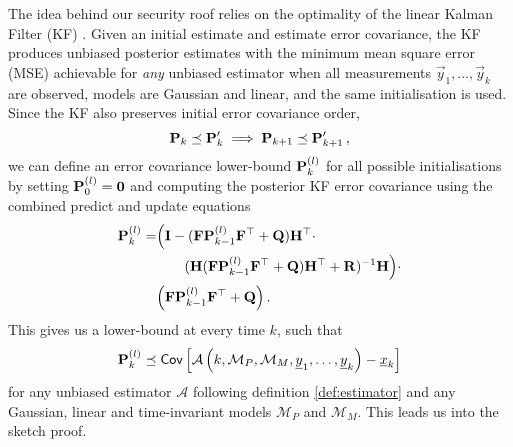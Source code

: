 \documentclass[letterpaper, 10 pt, conference]{IEEEtran}
\theoremstyle{definition}
\begin{document}
The idea behind our security roof relies on the optimality of the linear Kalman Filter (KF) \cite{haugBayesianEstimationTracking}. Given an initial estimate and estimate error covariance, the KF produces unbiased posterior estimates with the minimum mean square error (MSE) achievable for \textit{any} unbiased estimator when all measurements $\vec{y}_1,\dots,\vec{y}_k$ are observed, models are Gaussian and linear, and the same initialisation is used. Since the KF also preserves initial error covariance order,
\begin{equation}
   {\ensuremath{{\mathbf{P}}}}_k \preceq {\ensuremath{{\mathbf{P}}}}_k^\prime \implies {\ensuremath{{\mathbf{P}}}}_{k+1} \preceq {\ensuremath{{\mathbf{P}}}}_{k+1}^\prime\,,
\end{equation}
we can define an error covariance lower-bound ${{\mathbf{P}}}_k^{(l)}$ for all possible initialisations by setting ${{\mathbf{P}}}_0^{(l)} = {{\mathbf{0}}}$ and computing the posterior KF error covariance using the combined predict and update equations
\begin{equation}\label{eqn:lower_bound_error_cov}
   \begin{split}
      \mat{P}_k^{(l)} =& \Bigl( \mat{I} - (\mat{F}\mat{P}_{k-1}^{(l)}\mat{F}^\top + \mat{Q})\mat{H}^\top \cdot \\
      &\qquad(\mat{H}(\mat{F}\mat{P}_{k-1}^{(l)}\mat{F}^\top + \mat{Q})\mat{H}^\top + \mat{R})^{-1}\mat{H}\Bigr)\cdot\\
      &\Bigl(\mat{F}\mat{P}_{k-1}^{(l)}\mat{F}^\top + \mat{Q}\Bigr)\,.
   \end{split}
\end{equation}
This gives us a lower-bound at every time $k$, such that
\begin{equation}
   {\ensuremath{{\mathbf{P}}}}_k^{(l)} \preceq \mathsf{Cov}\left[\mathcal{A}\left(k, \mathcal{M}_P, \mathcal{M}_M, {\underline{y}}_1,\dots,{\underline{y}}_k\right) - {\underline{x}}_k \right]
\end{equation}
for any unbiased estimator $\mathcal{A}$ following definition \ref{def:estimator} and any Gaussian, linear and time-invariant models $\mathcal{M}_P$ and $\mathcal{M}_M$. This leads us into the sketch proof.
\end{document}
